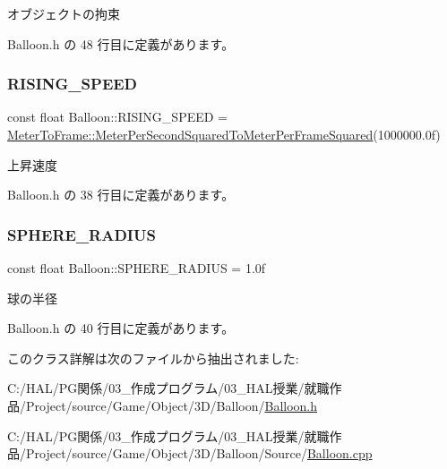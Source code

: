 オブジェクトの拘束 



 Balloon.\+h の 48 行目に定義があります。

\mbox{\label{class_balloon_a206b548c1ee7cf44616dbd2a0d7cc758}} 
\subsubsection{\texorpdfstring{R\+I\+S\+I\+N\+G\+\_\+\+S\+P\+E\+ED}{RISING\_SPEED}}
{\footnotesize\ttfamily const float Balloon\+::\+R\+I\+S\+I\+N\+G\+\_\+\+S\+P\+E\+ED = \mbox{\hyperlink{class_meter_to_frame_ac3292be31b35e97027a65b4c74763ebe}{Meter\+To\+Frame\+::\+Meter\+Per\+Second\+Squared\+To\+Meter\+Per\+Frame\+Squared}}(1000000.\+0f)\hspace{0.3cm}{\ttfamily [static]}}



上昇速度 



 Balloon.\+h の 38 行目に定義があります。

\mbox{\label{class_balloon_ae8db75393edbab7355e4d4df08a56e45}} 
\subsubsection{\texorpdfstring{S\+P\+H\+E\+R\+E\+\_\+\+R\+A\+D\+I\+US}{SPHERE\_RADIUS}}
{\footnotesize\ttfamily const float Balloon\+::\+S\+P\+H\+E\+R\+E\+\_\+\+R\+A\+D\+I\+US = 1.\+0f\hspace{0.3cm}{\ttfamily [static]}}



球の半径 



 Balloon.\+h の 40 行目に定義があります。



このクラス詳解は次のファイルから抽出されました\+:\begin{DoxyCompactItemize}
\item 
C\+:/\+H\+A\+L/\+P\+G関係/03\+\_\+作成プログラム/03\+\_\+\+H\+A\+L授業/就職作品/\+Project/source/\+Game/\+Object/3\+D/\+Balloon/\mbox{\hyperlink{_balloon_8h}{Balloon.\+h}}\item 
C\+:/\+H\+A\+L/\+P\+G関係/03\+\_\+作成プログラム/03\+\_\+\+H\+A\+L授業/就職作品/\+Project/source/\+Game/\+Object/3\+D/\+Balloon/\+Source/\mbox{\hyperlink{_balloon_8cpp}{Balloon.\+cpp}}\end{DoxyCompactItemize}
